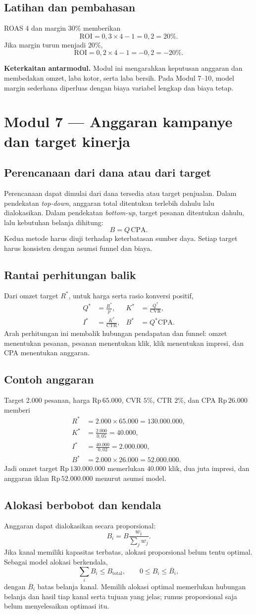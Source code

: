 \documentclass[11pt,a4paper]{article}
\newcommand{\modul}[2]{\clearpage\section{Modul #1 --- #2}}
\newcommand{\bagian}[1]{\Needspace{5\baselineskip}\subsection{#1}}
\newcommand{\jembatan}[1]{\par\textbf{Keterkaitan antarmodul.} #1\par}
\newcommand{\CTR}{\mathrm{CTR}}
\newcommand{\CVR}{\mathrm{CVR}}
\newcommand{\CPA}{\mathrm{CPA}}
\newcommand{\ROI}{\mathrm{ROI}}
\newcommand{\rp}[1]{\ensuremath{\mathrm{Rp}\,#1}}
\begin{document}
\bagian{Latihan dan pembahasan}
ROAS 4 dan margin \(30\%\) memberikan
\[
\ROI=0{,}3\times4-1=0{,}2=20\%.
\]
Jika margin turun menjadi \(20\%\),
\[
\ROI=0{,}2\times4-1=-0{,}2=-20\%.
\]
\jembatan{Modul ini mengarahkan keputusan anggaran dan membedakan omzet, laba kotor, serta laba bersih. Pada Modul 7--10, model margin sederhana diperluas dengan biaya variabel lengkap dan biaya tetap.}

\modul{7}{Anggaran kampanye dan target kinerja}
\bagian{Perencanaan dari dana atau dari target}
Perencanaan dapat dimulai dari dana tersedia atau target penjualan. Dalam pendekatan \emph{top-down}, anggaran total ditentukan terlebih dahulu lalu dialokasikan. Dalam pendekatan \emph{bottom-up}, target pesanan ditentukan dahulu, lalu kebutuhan belanja dihitung:
\[
B=Q\,\CPA.
\]
Kedua metode harus diuji terhadap keterbatasan sumber daya. Setiap target harus konsisten dengan asumsi funnel dan biaya.

\bagian{Rantai perhitungan balik}
Dari omzet target \(R^*\), untuk harga serta rasio konversi positif,
\[
\begin{aligned}
Q^*&=\frac{R^*}{p},& K^*&=\frac{Q^*}{\CVR},\\
I^*&=\frac{K^*}{\CTR},& B^*&=Q^*\CPA.
\end{aligned}
\]
Arah perhitungan ini membalik hubungan pendapatan dan funnel: omzet menentukan pesanan, pesanan menentukan klik, klik menentukan impresi, dan CPA menentukan anggaran.

\bagian{Contoh anggaran}
Target 2.000 pesanan, harga \rp{65.000}, CVR \(5\%\), CTR \(2\%\), dan CPA \rp{26.000} memberi
\[
\begin{aligned}
R^*&=2.000\times65.000=130.000.000,\\
K^*&=\frac{2.000}{0{,}05}=40.000,\\
I^*&=\frac{40.000}{0{,}02}=2.000.000,\\
B^*&=2.000\times26.000=52.000.000.
\end{aligned}
\]
Jadi omzet target \rp{130.000.000} memerlukan 40.000 klik, dua juta impresi, dan anggaran iklan \rp{52.000.000} menurut asumsi model.

\bagian{Alokasi berbobot dan kendala}
Anggaran dapat dialokasikan secara proporsional:
\[
B_i=B\frac{w_i}{\sum_jw_j}.
\]
Jika kanal memiliki kapasitas terbatas, alokasi proporsional belum tentu optimal. Sebagai model alokasi berkendala,
\[
\sum_iB_i\le B_{\text{total}},\qquad
0\le B_i\le\overline{B}_i,
\]
dengan \(\overline{B}_i\) batas belanja kanal. Memilih alokasi optimal memerlukan hubungan belanja dan hasil tiap kanal serta tujuan yang jelas; rumus proporsional saja belum menyelesaikan optimasi itu.
\end{document}
